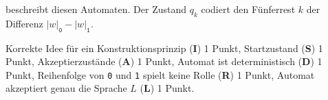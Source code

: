 \begin{loesung}
\begin{center}
\end{center}
beschreibt diesen Automaten.
Der Zustand $q_k$ codiert den Fünferrest $k$ der Differenz
$|w|_{\texttt{0}}-|w|_{\texttt{1}}$.
\end{loesung}

\begin{bewertung}
Korrekte Idee für ein Konstruktionsprinzip ({\bf I}) 1 Punkt,
Startzustand ({\bf S}) 1 Punkt,
Akzeptierzustände ({\bf A}) 1 Punkt,
Automat ist deterministisch ({\bf D}) 1 Punkt,
Reihenfolge von \texttt{0} und \texttt{1} spielt keine Rolle ({\bf R}) 1 Punkt,
Automat akzeptiert genau die Sprache $L$ ({\bf L}) 1 Punkt.
\end{bewertung}
